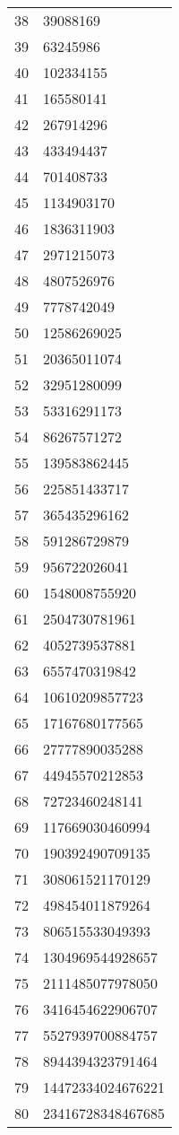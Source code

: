 \documentclass[12pt]{article}
\begin{document}
\begin{tabular}{l|l}
38 & 39088169 \\
39 & 63245986 \\
40 & 102334155 \\
41 & 165580141 \\
42 & 267914296 \\
43 & 433494437 \\
44 & 701408733 \\
45 & 1134903170 \\
46 & 1836311903 \\
47 & 2971215073 \\
48 & 4807526976 \\
49 & 7778742049 \\
50 & 12586269025 \\
51 & 20365011074 \\
52 & 32951280099 \\
53 & 53316291173 \\
54 & 86267571272 \\
55 & 139583862445 \\
56 & 225851433717 \\
57 & 365435296162 \\
58 & 591286729879 \\
59 & 956722026041 \\
60 & 1548008755920 \\
61 & 2504730781961 \\
62 & 4052739537881 \\
63 & 6557470319842 \\
64 & 10610209857723 \\
65 & 17167680177565 \\
66 & 27777890035288 \\
67 & 44945570212853 \\
68 & 72723460248141 \\
69 & 117669030460994 \\
70 & 190392490709135 \\
71 & 308061521170129 \\
72 & 498454011879264 \\
73 & 806515533049393 \\
74 & 1304969544928657 \\
75 & 2111485077978050 \\
76 & 3416454622906707 \\
77 & 5527939700884757 \\
78 & 8944394323791464 \\
79 & 14472334024676221 \\
80 & 23416728348467685 \\

\end{tabular}
\end{document}
